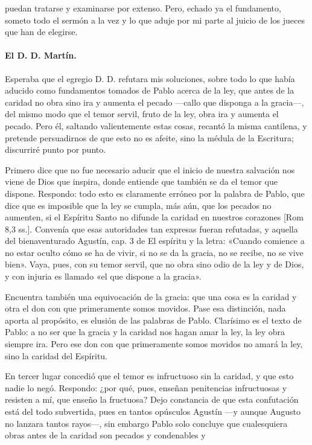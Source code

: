 puedan tratarse y examinarse por extenso. Pero, echado ya el fundamento, someto todo el sermón a la vez y lo que aduje por mi parte al juicio de los jueces que han de elegirse.

\paragraph*{El D. D. Martín.}

Esperaba que el egregio D. D. refutara mis soluciones, sobre todo lo que había aducido como fundamentos tomados de Pablo acerca de la ley, que antes de la caridad no obra sino ira y aumenta el pecado —callo que disponga a la gracia—, del mismo modo que el temor servil, fruto de la ley, obra ira y aumenta el pecado. Pero él, saltando valientemente estas cosas, recantó la misma cantilena, y pretende persuadirnos de que esto no es afeite, sino la médula de la Escritura; discurriré punto por punto.

Primero dice que no fue necesario aducir que el inicio de nuestra salvación nos viene de Dios que inspira, donde entiende que también se da el temor que dispone. Respondo: todo esto es claramente erróneo por la palabra de Pablo, que dice que es imposible que la ley se cumpla, más aún, que los pecados no aumenten, si el Espíritu Santo no difunde la caridad en nuestros corazones [Rom 8,3 ss.]. Convenía que esas autoridades tan expresas fueran refutadas, y aquella del bienaventurado Agustín, cap. 3 de El espíritu y la letra: «Cuando comience a no estar oculto cómo se ha de vivir, si no se da la gracia, no se recibe, no se vive bien». Vaya, pues, con su temor servil, que no obra sino odio de la ley y de Dios, y con injuria es llamado «el que dispone a la gracia».

Encuentra también una equivocación de la gracia: que una cosa es la caridad y otra el don con que primeramente somos movidos. Pase esa distinción, nada aporta al propósito, es elusión de las palabras de Pablo. Clarísimo es el texto de Pablo: a no ser que la gracia y la caridad nos hagan amar la ley, la ley obra siempre ira. Pero ese don con que primeramente somos movidos no amará la ley, sino la caridad del Espíritu.

En tercer lugar concedió que el temor es infructuoso sin la caridad, y que esto nadie lo negó. Respondo: ¿por qué, pues, enseñan penitencias infructuosas y resisten a mí, que enseño la fructuosa? Dejo constancia de que esta confutación está del todo subvertida, pues en tantos opúsculos Agustín —y aunque Augusto no lanzara tantos rayos—, sin embargo Pablo solo concluye que cualesquiera obras antes de la caridad son pecados y condenables \marginpar{\small[369]} y


